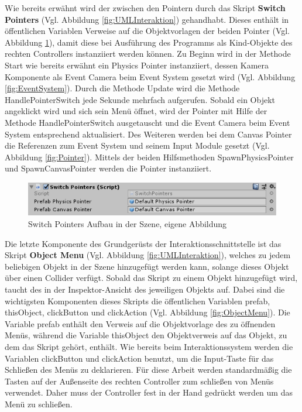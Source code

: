 \newline
Wie bereits erwähnt wird der zwischen den Pointern durch das Skript \textbf{Switch Pointers} (Vgl. Abbildung \ref{fig:UMLInteraktion}) gehandhabt. Dieses enthält in öffentlichen Variablen Verweise auf die Objektvorlagen der beiden Pointer (Vgl. Abbildung \ref{fig:SwitchPointer}), damit diese bei Ausführung des Programms als Kind-Objekte des rechten Controllers instanziiert werden können.
\newline
Zu Beginn wird in der Methode Start wie bereits erwähnt ein Physics Pointer instanziiert, dessen Kamera Komponente als Event Camera beim Event System gesetzt wird (Vgl. Abbildung \ref{fig:EventSystem}). Durch die Methode Update wird die Methode HandlePointerSwitch jede Sekunde mehrfach aufgerufen. Sobald ein Objekt angeklickt wird und sich sein Menü öffnet, wird der Pointer mit Hilfe der Methode HandlePointerSwitch ausgetauscht und die Event Camera beim Event System entsprechend aktualisiert. Des Weiteren werden bei dem Canvas Pointer die Referenzen zum Event System und seinem Input Module gesetzt (Vgl. Abbildung \ref{fig:Pointer}). Mittels der beiden Hilfsmethoden SpawnPhysicsPointer und SpawnCanvasPointer werden die Pointer instanziiert.
\begin{figure}[h]
	\centering
	\includegraphics[width=0.6\linewidth]{Bilder/A45_SwitchPointer}
	\caption{Switch Pointers Aufbau in der Szene, eigene Abbildung}
	\label{fig:SwitchPointer}
\end{figure}
\newline
Die letzte Komponente des Grundgerüsts der Interaktionsschnittstelle ist das Skript \textbf{Object Menu} (Vgl. Abbildung \ref{fig:UMLInteraktion}), welches zu jedem beliebigen Objekt in der Szene hinzugefügt werden kann, solange dieses Objekt über einen Collider verfügt. Sobald das Skript zu einem Objekt hinzugefügt wird, taucht des in der Inspektor-Ansicht des jeweiligen Objekts auf. Dabei sind die wichtigsten Komponenten dieses Skripts die öffentlichen Variablen prefab, thisObject, clickButton und clickAction (Vgl. Abbildung \ref{fig:ObjectMenu}). Die Variable prefab enthält den Verweis auf die Objektvorlage des zu öffnenden Menüs, während die Variable thisObject den Objektverweis auf das Objekt, zu dem das Skript gehört, enthält. Wie bereits beim Interaktionssystem werden die Variablen clickButton und clickAction benutzt, um die Input-Taste für das Schließen des Menüs zu deklarieren. Für diese Arbeit werden standardmäßig die Tasten auf der Außenseite des rechten Controller zum schließen von Menüs verwendet. Daher muss der Controller fest in der Hand gedrückt werden um das Menü zu schließen.
